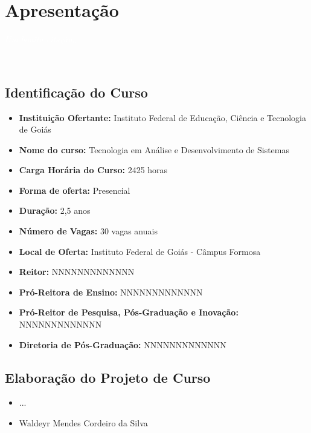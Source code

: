 \documentclass[11pt,fleqn]{book} %
\begin{document}
\renewcommand\contentsname{Sumário}
\tableofcontents

\chapter{Apresentação}\label{apresentacao}
\vspace{6em}
\begin{flushright}
	\textit{\textcolor{white}{Um bonita citação...}}
\end{flushright}
\vspace{12em}

~\parencite{Resolucao3De2002}


\newpage  
\section{Identificação do Curso}
\begin{itemize}
	\item \textbf{Instituição Ofertante:} Instituto Federal de Educação, Ciência e Tecnologia de Goiás
	\item \textbf{Nome do curso:} Tecnologia em Análise e Desenvolvimento de Sistemas
	\item \textbf{Carga Horária do Curso:} 2425 horas
	\item \textbf{Forma de oferta:} Presencial
	\item \textbf{Duração:} 2,5 anos
	\item \textbf{Número de Vagas:} 30 vagas anuais
	\item \textbf{Local de Oferta:} Instituto Federal de Goiás - Câmpus Formosa
	\item \textbf{Reitor:} NNNNNNNNNNNNN
	\item \textbf{Pró-Reitora de Ensino:} NNNNNNNNNNNNN
	\item \textbf{Pró-Reitor de Pesquisa, Pós-Graduação e Inovação:} NNNNNNNNNNNNN
	\item \textbf{Diretoria de Pós-Graduação:} NNNNNNNNNNNNN
\end{itemize}

\section{Elaboração do Projeto de Curso}
\begin{itemize}[label=\bfseries]
	\item ...
	\item Waldeyr Mendes Cordeiro da Silva
\end{itemize}
\end{document}
